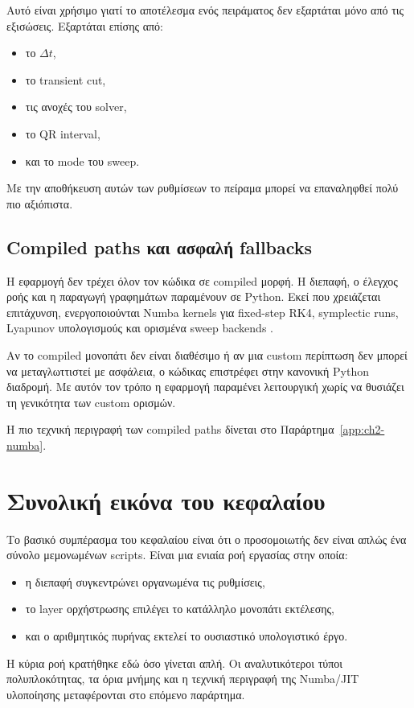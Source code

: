 Αυτό είναι χρήσιμο γιατί το αποτέλεσμα ενός πειράματος δεν εξαρτάται μόνο από
τις εξισώσεις. Εξαρτάται επίσης από:
\begin{itemize}
\item το \(\Delta t\),
\item το transient cut,
\item τις ανοχές του solver,
\item το QR interval,
\item και το mode του sweep.
\end{itemize}

Με την αποθήκευση αυτών των ρυθμίσεων το πείραμα μπορεί να επαναληφθεί πολύ πιο
αξιόπιστα.

\subsection{Compiled paths και ασφαλή fallbacks}
\label{subsec:ch2-numba-short}

Η εφαρμογή δεν τρέχει όλον τον κώδικα σε compiled μορφή. Η διεπαφή, ο έλεγχος
ροής και η παραγωγή γραφημάτων παραμένουν σε Python. Εκεί που χρειάζεται
επιτάχυνση, ενεργοποιούνται Numba kernels για fixed-step RK4, symplectic runs,
Lyapunov υπολογισμούς και ορισμένα sweep backends
\cite{nlds_src_core_numba,nlds_src_app_numba_custom}.

Αν το compiled μονοπάτι δεν είναι διαθέσιμο ή αν μια custom περίπτωση δεν
μπορεί να μεταγλωττιστεί με ασφάλεια, ο κώδικας επιστρέφει στην κανονική
Python διαδρομή. Με αυτόν τον τρόπο η εφαρμογή παραμένει λειτουργική χωρίς να
θυσιάζει τη γενικότητα των custom ορισμών.

Η πιο τεχνική περιγραφή των compiled paths δίνεται στο
Παράρτημα~\ref{app:ch2-numba}.

\section{Συνολική εικόνα του κεφαλαίου}
\label{sec:ch2-closing}

Το βασικό συμπέρασμα του κεφαλαίου είναι ότι ο προσομοιωτής δεν είναι απλώς ένα
σύνολο μεμονωμένων scripts. Είναι μια ενιαία ροή εργασίας στην οποία:
\begin{itemize}
\item η διεπαφή συγκεντρώνει οργανωμένα τις ρυθμίσεις,
\item το layer ορχήστρωσης επιλέγει το κατάλληλο μονοπάτι εκτέλεσης,
\item και ο αριθμητικός πυρήνας εκτελεί το ουσιαστικό υπολογιστικό έργο.
\end{itemize}

Η κύρια ροή κρατήθηκε εδώ όσο γίνεται απλή. Οι αναλυτικότεροι τύποι
πολυπλοκότητας, τα όρια μνήμης και η τεχνική περιγραφή της Numba/JIT
υλοποίησης μεταφέρονται στο επόμενο παράρτημα.
